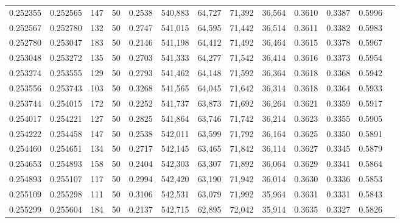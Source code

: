 \begin{tabular}{rrrrrrrrrrrrr}
0.252355 & 0.252565 &   147 &  50 &                                     0.2538 & 540,883 &  64,727 &  71,392 &  36,564 & 0.3610 & 0.3387 & 0.5996 \\
0.252567 & 0.252780 &   132 &  50 &                                     0.2747 & 541,015 &  64,595 &  71,442 &  36,514 & 0.3611 & 0.3382 & 0.5983 \\
0.252780 & 0.253047 &   183 &  50 &                                     0.2146 & 541,198 &  64,412 &  71,492 &  36,464 & 0.3615 & 0.3378 & 0.5967 \\
0.253048 & 0.253272 &   135 &  50 &                                     0.2703 & 541,333 &  64,277 &  71,542 &  36,414 & 0.3616 & 0.3373 & 0.5954 \\
0.253274 & 0.253555 &   129 &  50 &                                     0.2793 & 541,462 &  64,148 &  71,592 &  36,364 & 0.3618 & 0.3368 & 0.5942 \\
0.253556 & 0.253743 &   103 &  50 &                                     0.3268 & 541,565 &  64,045 &  71,642 &  36,314 & 0.3618 & 0.3364 & 0.5933 \\
0.253744 & 0.254015 &   172 &  50 &                                     0.2252 & 541,737 &  63,873 &  71,692 &  36,264 & 0.3621 & 0.3359 & 0.5917 \\
0.254017 & 0.254221 &   127 &  50 &                                     0.2825 & 541,864 &  63,746 &  71,742 &  36,214 & 0.3623 & 0.3355 & 0.5905 \\
0.254222 & 0.254458 &   147 &  50 &                                     0.2538 & 542,011 &  63,599 &  71,792 &  36,164 & 0.3625 & 0.3350 & 0.5891 \\
0.254460 & 0.254651 &   134 &  50 &                                     0.2717 & 542,145 &  63,465 &  71,842 &  36,114 & 0.3627 & 0.3345 & 0.5879 \\
0.254653 & 0.254893 &   158 &  50 &                                     0.2404 & 542,303 &  63,307 &  71,892 &  36,064 & 0.3629 & 0.3341 & 0.5864 \\
0.254893 & 0.255107 &   117 &  50 &                                     0.2994 & 542,420 &  63,190 &  71,942 &  36,014 & 0.3630 & 0.3336 & 0.5853 \\
0.255109 & 0.255298 &   111 &  50 &                                     0.3106 & 542,531 &  63,079 &  71,992 &  35,964 & 0.3631 & 0.3331 & 0.5843 \\
0.255299 & 0.255604 &   184 &  50 &                                     0.2137 & 542,715 &  62,895 &  72,042 &  35,914 & 0.3635 & 0.3327 & 0.5826 \\

\end{tabular}
